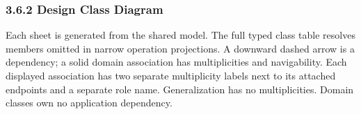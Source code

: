 \subsubsection*{3.6.2 Design Class Diagram}
Each sheet is generated from the shared model. The full typed class table resolves members omitted in narrow operation projections. A downward dashed arrow is a dependency; a solid domain association has multiplicities and navigability. Each displayed association has two separate multiplicity labels next to its attached endpoints and a separate role name. Generalization has no multiplicities. Domain classes own no application dependency.
